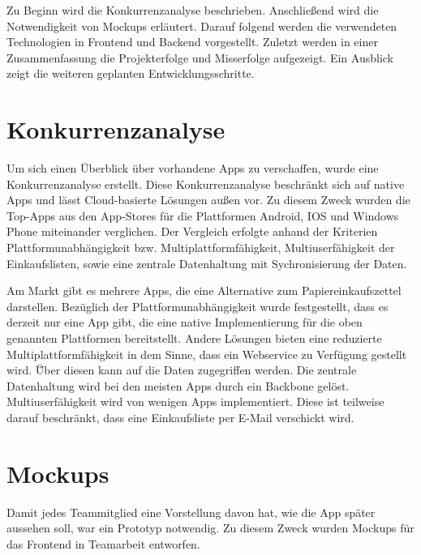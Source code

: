 \documentclass[10pt, conference, compsocconf]{IEEEtran}
\begin{document}
Zu Beginn wird die Konkurrenzanalyse beschrieben. 
Anschließend wird die Notwendigkeit von Mockups erläutert. 
Darauf folgend werden die verwendeten Technologien in Frontend und Backend vorgestellt. 
Zuletzt werden in einer Zusammenfassung die Projekterfolge und Misserfolge aufgezeigt.
Ein Ausblick zeigt die weiteren geplanten Entwicklungsschritte.

\section{Konkurrenzanalyse}
Um sich einen \"Uberblick \"uber vorhandene Apps zu verschaffen, wurde eine Konkurrenzanalyse erstellt.
Diese Konkurrenzanalyse beschr\"ankt sich auf native Apps und l\"asst Cloud-basierte L\"osungen au{\ss}en vor.
Zu diesem Zweck wurden die Top-Apps aus den App-Stores f\"ur die Plattformen Android, IOS und Windows Phone miteinander verglichen.
Der Vergleich erfolgte anhand der Kriterien Plattformunabh\"angigkeit bzw. Multiplattformf\"ahigkeit, Multiuserf\"ahigkeit der Einkaufslisten, sowie eine zentrale Datenhaltung mit Sychronisierung der Daten.

Am Markt gibt es mehrere Apps, die eine Alternative zum Papiereinkaufszettel darstellen.
Bez\"uglich der Plattformunabh\"angigkeit wurde festgestellt, dass es derzeit nur eine App gibt, die eine native Implementierung f\"ur die oben genannten Plattformen bereitstellt. 
Andere L\"osungen bieten eine reduzierte Multiplattformf\"ahigkeit in dem Sinne, dass ein Webservice zu Verf\"ugung gestellt wird.
\"Über diesen kann auf die Daten zugegriffen werden.
Die zentrale Datenhaltung wird bei den meisten Apps durch ein Backbone gel\"ost.
Multiuserf\"ahigkeit wird von wenigen Apps implementiert. Diese ist teilweise darauf beschr\"ankt, dass eine Einkaufsliste per E-Mail verschickt wird.

\section{Mockups}
Damit jedes Teammitglied eine Vorstellung davon hat, wie die App sp\"ater aussehen soll, war ein Prototyp notwendig.
Zu diesem Zweck wurden Mockups f\"ur das Frontend in Teamarbeit entworfen. 
\end{document}

